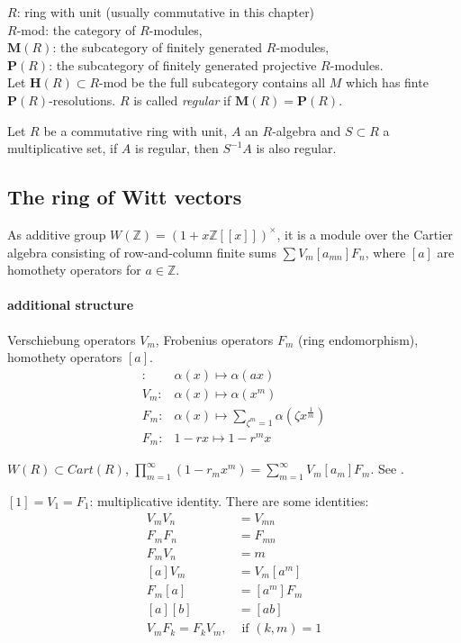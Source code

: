 $R$: ring with unit (usually commutative in this chapter)\\
$R$-mod: the category of $R$-modules,\\
$\mathbf{M}(R)$: the subcategory of finitely generated $R$-modules,\\
$\mathbf{P}(R)$: the subcategory of finitely generated projective $R$-modules.\\


Let $\mathbf{H}(R)\subset \mbox{$R$-mod} $ be the full subcategory contains all $M$ which has finte $\mathbf{P}(R)$-resolutions. $R$ is called {\em{regular}} if $\mathbf{M}(R)=\mathbf{P}(R)$.

\begin{prop}
	Let $R$ be a commutative ring with unit, $A$ an $R$-algebra and $S\subset R$ a multiplicative set, if $A$ is regular, then $S^{-1}A$ is also regular.
\end{prop}

\subsection{The ring of Witt vectors} %
\label{sub:the_ring_of_witt_vectors}
As additive group $W(\mathbb{Z})=(1+x \mathbb{Z}[[x]])^{\times}$, it is a module over the Cartier algebra consisting of row-and-column finite sums $\sum V_m [a_{mn}]F_n$, where $[a]$ are homothety operators for $a\in \mathbb{Z}$.

\paragraph{additional structure}
Verschiebung operators $V_m$, Frobenius operators $F_m$ (ring endomorphism), homothety operators $[a]$.
\begin{align*}
[a]\colon & \alpha(x) \mapsto \alpha(ax)\\
V_m\colon & \alpha(x) \mapsto \alpha(x^m)\\
F_m\colon & \alpha(x) \mapsto \sum_{\zeta^m=1} \alpha(\zeta x^{\frac{1}{m}})\\
F_m\colon & 1-rx \mapsto 1-r^mx
\end{align*}
\begin{remark}
	$W(R)\subset Cart(R)$, $\prod_{m=1}^\infty(1-r_mx^m)=\sum_{m=1}^\infty V_m[a_m]F_m$. See \cite{MR96j:16008}.
\end{remark}
\begin{prop}
	$[1]=V_1=F_1$: multiplicative identity. There are some identities:
	\begin{align*}
	 V_mV_n&=V_{mn}\\
	 F_mF_n&=F_{mn}\\
	 F_mV_n&=m\\
	 [a]V_m&=V_{m}[a^m]\\
	 F_m[a]&=[a^m] F_m\\
	 [a][b]&=[ab]\\
	 V_mF_k=F_kV_m,&\mbox{ if } (k,m)=1 \\
	\end{align*}
	
\end{prop}

